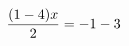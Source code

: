 \documentclass[preview]{standalone}
\begin{document}
\begin{align*}
\special{dvisvgm:raw <g id='unique000'>}\frac{(1 - 4) x}{2} = -1 - 3\special{dvisvgm:raw </g>}
\end{align*}
\end{document}
